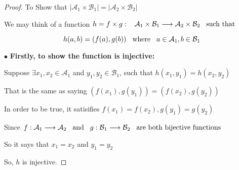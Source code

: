 \documentclass[12pt]{article}
\begin{document}
\begin{proof}

To Show that $ \vert \mathcal{A}_1 \times \mathcal{B}_1 \vert
    = \vert \mathcal{A}_2 \times \mathcal{B}_2 \vert $

\vspace*{0.3cm}
\hspace*{1.2cm}
We may think of a function $ h = f \times g :\hspace*{0.3cm} \mathcal{A}_1 \times \mathcal{B}_1  \longrightarrow
\mathcal{A}_2 \times \mathcal{B}_2 \hspace*{0.3cm} \text{such that}$


\[ h(a,b) = ( f(a),g(b)) \hspace*{0.3cm} \text{where} 
\hspace*{0.3cm} a \in \mathcal{A}_1 , b \in \mathcal{B}_1\]

\vspace*{0.3cm}
\hspace*{1.2cm}
$\bullet$ \textbf{Firstly, to show the function is injective:}


\vspace*{0.3cm}
\hspace*{1.2cm}
Suppose $\exists x_1, x_2 \in \mathcal{A}_1$ and $y_1, y_2 
\in \mathcal{B}_1 $, such that $ h(x_1,y_1) = h(x_2,y_2)$

\vspace*{0.3cm}
\hspace*{1.2cm}
That is the same as saying $ (f(x_1),g(y_1) ) = (f(x_2),g(y_2))$

\vspace*{0.3cm}
\hspace*{1.2cm}
In order to be true, it satisifies $ f(x_1) = f(x_2) ,  g(y_1) = g(y_2) $


\vspace*{0.3cm}
\hspace*{1.2cm}
Since $ f: \mathcal{A}_1 \longrightarrow \mathcal{A}_2 \hspace*{0.3cm}\text{and}
\hspace*{0.3cm} g: \mathcal{B}_1 \longrightarrow \mathcal{B}_2 \hspace{0,3cm}\text{are both
bijective functions} $

\vspace*{0.3cm}
\hspace*{1.2cm}
So it says that $ x_1 =x_2$ and $y_1 = y_2$

\vspace*{0.3cm}
\hspace*{1.2cm}
So, $h$ is injective.


\end{proof}
\end{document}
